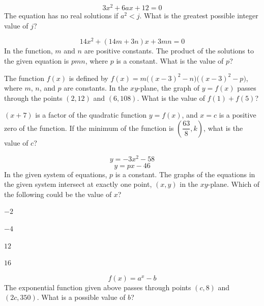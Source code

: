 \vfill
\noindent\begin{minipage}{\linewidth}
\par\smallskip
$$3x^2+6ax+12=0$$ The equation has no real solutions if $a^2<j$. What is the greatest possible integer value of $j$?
\end{minipage}
\vfill
\noindent\begin{minipage}{\linewidth}
\par\smallskip
$$14x^2+(14m+3n)x+3mn=0$$ In the function, $m$ and $n$ are positive constants. The product of the solutions to the given equation is $pmn$, where $p$ is a constant. What is the value of $p$?
\end{minipage}
\vfill
\clearpage
\noindent\begin{minipage}{\linewidth}
\par\smallskip
The function $f(x)$ is defined by $f(x)=m\bigl((x-3)^2-n\bigr)\bigl((x-3)^2-p\bigr)$, where $m$, $n$, and $p$ are constants. In the $xy$-plane, the graph of $y=f(x)$ passes through the points $(2,12)$ and $(6,108)$. What is the value of $f(1)+f(5)$?
\end{minipage}
\vfill
\noindent\begin{minipage}{\linewidth}
\par\smallskip
$(x+7)$ is a factor of the quadratic function $y=f(x)$, and $x=c$ is a positive zero of the function. If the minimum of the function is $\left(\dfrac{63}{8},k\right)$, what is the value of $c$?
\end{minipage}
\vfill
\noindent\begin{minipage}{\linewidth}
\par\smallskip
$$y=-3x^2-58$$ $$y=px-46$$ In the given system of equations, $p$ is a constant. The graphs of the equations in the given system intersect at exactly one point, $(x,y)$ in the $xy$-plane. Which of the following could be the value of $x$?
\begin{satchoices}
  \item[A)] $-2$
  \item[B)] $-4$
  \item[C)] $12$
  \item[D)] $16$
\end{satchoices}
\end{minipage}
\vfill
\clearpage
\noindent\begin{minipage}{\linewidth}
\par\smallskip
$$f(x)=a^x-b$$ The exponential function given above passes through points $(c,8)$ and $(2c,350)$. What is a possible value of $b$?
\end{minipage}
